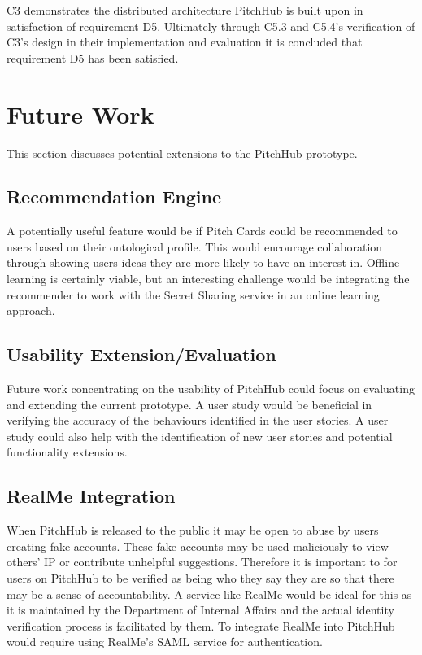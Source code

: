 C3 demonstrates the distributed architecture PitchHub is built upon in satisfaction of requirement D5. Ultimately through C5.3 and C5.4's verification of C3's design in their implementation and evaluation it is concluded that requirement D5 has been satisfied.

\section{Future Work}

This section discusses potential extensions to the PitchHub prototype.

\subsection{Recommendation Engine}

A potentially useful feature would be if Pitch Cards could be recommended to users based on their ontological profile. This would encourage collaboration through showing users ideas they are more likely to have an interest in. Offline learning is certainly viable, but an interesting challenge would be integrating the recommender to work with the Secret Sharing service in an online learning approach.

\subsection{Usability Extension/Evaluation}

Future work concentrating on the usability of PitchHub could focus on evaluating and extending the current prototype. A user study would be beneficial in verifying the accuracy of the behaviours identified in the user stories. A user study could also help with the identification of new user stories and potential functionality extensions. 

\subsection{RealMe Integration}

When PitchHub is released to the public it may be open to abuse by users creating fake accounts. These fake accounts may be used maliciously to view others' IP or contribute unhelpful suggestions. Therefore it is important to for users on PitchHub to be verified as being who they say they are so that there may be a sense of accountability. A service like RealMe would be ideal for this as it is maintained by the Department of Internal Affairs and the actual identity verification process is facilitated by them. To integrate RealMe into PitchHub would require using RealMe's SAML service for authentication.